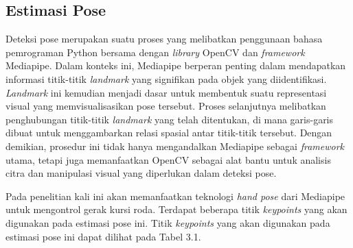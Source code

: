 \subsection{Estimasi Pose}
Deteksi pose merupakan suatu proses yang melibatkan penggunaan bahasa pemrograman Python bersama dengan \emph{library} OpenCV dan \emph{framework} Mediapipe. Dalam konteks ini, Mediapipe berperan penting dalam mendapatkan informasi titik-titik \emph{landmark} yang signifikan pada objek yang diidentifikasi. \emph{Landmark} ini kemudian menjadi dasar untuk membentuk suatu representasi visual yang memvisualisasikan pose tersebut. Proses selanjutnya melibatkan penghubungan titik-titik \emph{landmark} yang telah ditentukan, di mana garis-garis dibuat untuk menggambarkan relasi spasial antar titik-titik tersebut. Dengan demikian, prosedur ini tidak hanya mengandalkan Mediapipe sebagai \emph{framework} utama, tetapi juga memanfaatkan OpenCV sebagai alat bantu untuk analisis citra dan manipulasi visual yang diperlukan dalam deteksi pose.

Pada penelitian kali ini akan memanfaatkan teknologi \emph{hand pose} dari Mediapipe untuk mengontrol gerak kursi roda. Terdapat beberapa titik \emph{keypoints} yang akan digunakan pada estimasi pose ini. Titik \emph{keypoints} yang akan digunakan pada estimasi  pose ini dapat dilihat pada Tabel 3.1.

